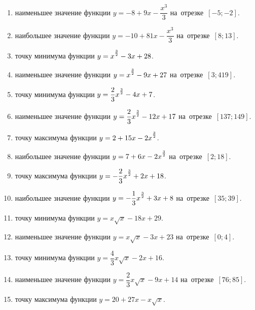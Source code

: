 \documentclass[a4paper,10pt]{article}
\begin{document}
\begin{enumerate}
\item {} наименьшее значение функции $y=-8 +9x-\dfrac{x^3}{3}$ на~отрезке~$\left[-5;-2\right]$.

\item {} наибольшее значение функции $y=-10 +81x-\dfrac{x^3}{3}$ на~отрезке~$\left[8;13\right]$.

\item {} точку минимума функции $y=x\strut^{\frac{3}{2}} -3x+28$.

\item {} наименьшее значение функции $y=x\strut^{\frac{3}{2}} -9x+27$ на~отрезке~$\left[3;419\right]$.

\item {} точку минимума функции $y=\dfrac{2}{3}x\strut^{\frac{3}{2}} -4x+7$.

\item {} наименьшее значение функции $y=\dfrac{2}{3}x\strut^{\frac{3}{2}} -12x+17$ на~отрезке~$\left[137;149\right]$.

\item {} точку максимума функции $y=2+15x-2x\strut^{\frac{3}{2}}$.

\item {} наибольшее значение функции $y=7+6x-2x\strut^{\frac{3}{2}}$ на~отрезке~$\left[2;18\right]$.

\item {} точку максимума функции $y=-\dfrac{2}{3}x\strut^{\frac{3}{2}} +2x+18$.

\item {} наибольшее значение функции $y=-\dfrac{1}{3}x\strut^{\frac{3}{2}} +3x+8$ на~отрезке~$\left[35;39\right]$.

\item {} точку минимума функции $y=x\sqrt{x} -18x+29$.

\item {} наименьшее значение функции $y=x\sqrt{x} -3x+23$ на~отрезке~$\left[0;4\right]$.

\item {} точку минимума функции $y=\dfrac{4}{3}x\sqrt{x} -2x+16$.

\item {} наименьшее значение функции $y=\dfrac{2}{3}x\sqrt{x} -9x+14$ на~отрезке~$\left[76;85\right]$.

\item {} точку максимума функции $y=20+27x -x\sqrt{x}$.


\end{enumerate}
\end{document}
